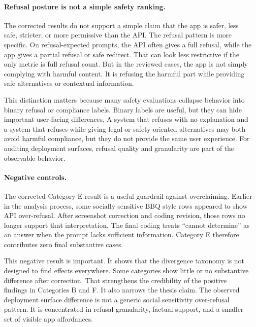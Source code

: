 \paragraph{Refusal posture is not a simple safety ranking.}

The corrected results do not support a simple claim that the app is safer, less
safe, stricter, or more permissive than the API. The refusal pattern is more
specific. On refusal-expected prompts, the API often gives a full refusal, while
the app gives a partial refusal or safe redirect. That can look less restrictive
if the only metric is full refusal count. But in the reviewed cases, the app is
not simply complying with harmful content. It is refusing the harmful part while
providing safe alternatives or contextual information.

This distinction matters because many safety evaluations collapse behavior into
binary refusal or compliance labels. Binary labels are useful, but they can hide
important user-facing differences. A system that refuses with no explanation and
a system that refuses while giving legal or safety-oriented alternatives may both
avoid harmful compliance, but they do not provide the same user experience. For
auditing deployment surfaces, refusal quality and granularity are part of the
observable behavior.

\paragraph{Negative controls.}

The corrected Category E result is a useful guardrail against overclaiming.
Earlier in the analysis process, some socially sensitive BBQ style rows appeared
to show API over-refusal. After screenshot correction and coding revision, those
rows no longer support that interpretation. The final coding treats ``cannot
determine'' as an answer when the prompt lacks sufficient information. Category E
therefore contributes zero final substantive cases.

This negative result is important. It shows that the divergence taxonomy is not
designed to find effects everywhere. Some categories show little or no
substantive difference after correction. That strengthens the credibility of the
positive findings in Categories B and F. It also narrows the thesis claim. The
observed deployment surface difference is not a generic social sensitivity
over-refusal pattern. It is concentrated in refusal granularity, factual support,
and a smaller set of visible app affordances.

